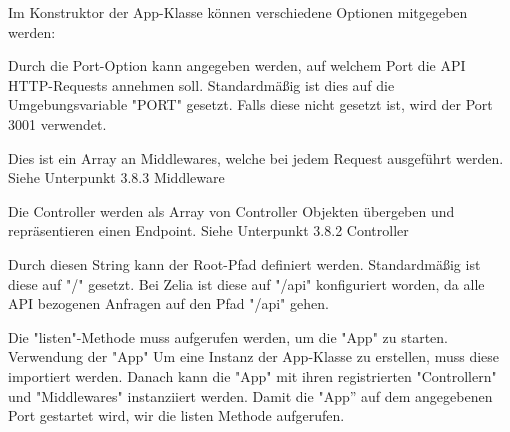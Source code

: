 
Im Konstruktor der App-Klasse können verschiedene Optionen mitgegeben werden:


Durch die Port-Option kann angegeben werden, auf welchem Port die API HTTP-Requests annehmen soll. Standardmäßig ist dies auf die Umgebungsvariable "PORT" gesetzt. Falls diese nicht gesetzt ist, wird der Port 3001 verwendet.


Dies ist ein Array an Middlewares, welche bei jedem Request ausgeführt werden. Siehe Unterpunkt 3.8.3 Middleware


Die Controller werden als Array von Controller Objekten übergeben und repräsentieren einen Endpoint. Siehe Unterpunkt 3.8.2 Controller


Durch diesen String kann der Root-Pfad definiert werden. Standardmäßig ist diese auf "/" gesetzt. Bei Zelia ist diese auf "/api" konfiguriert worden, da alle API bezogenen Anfragen auf den Pfad "/api" gehen.

Die "listen"-Methode muss aufgerufen werden, um die "App" zu starten.
Verwendung der "App"
Um eine Instanz der App-Klasse zu erstellen, muss diese importiert werden. Danach kann die "App" mit ihren registrierten "Controllern" und "Middlewares" instanziiert werden. Damit die "App” auf dem angegebenen Port gestartet wird, wir die listen Methode aufgerufen.

